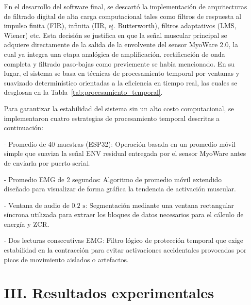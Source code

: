 \documentclass[conference]{IEEEtran}
\begin{document}
En el desarrollo del software final, se descart\'o la implementaci\'on de arquitecturas de filtrado digital de alta carga computacional tales como filtros de respuesta al impulso finita (FIR), infinita (IIR, ej. Butterworth), filtros adaptativos (LMS, Wiener) etc. Esta decisi\'on se justifica en que la se\~nal muscular principal se adquiere directamente de la salida de la envolvente del sensor MyoWare 2.0, la cual ya integra una etapa anal\'ogica de amplificaci\'on, rectificaci\'on de onda completa y filtrado paso-bajas como previemente se habia mencionado. En su lugar, el sistema se basa en t\'ecnicas de procesamiento temporal por ventanas y suavizado determin\'istico orientadas a la eficiencia en tiempo real, las cuales se desglosan en la Tabla~\ref{tab:procesamiento_temporal}.\cite{b5}

Para garantizar la estabilidad del sistema sin un alto costo computacional, se implementaron cuatro estrategias de procesamiento temporal descritas a continuaci\'on:

\begin{description}
    \item{- Promedio de 40 muestras (ESP32):} Operaci\'on basada en un promedio m\'ovil simple que suaviza la se\~nal ENV residual entregada por el sensor MyoWare antes de enviarla por puerto serial.
    \item{- Promedio EMG de 2 segundos:} Algoritmo de promedio m\'ovil extendido dise\~nado para visualizar de forma gr\'afica la tendencia de activaci\'on muscular.
    \item{- Ventana de audio de $0.2\text{ s}$:} Segmentaci\'on mediante una ventana rectangular s\'incrona utilizada para extraer los bloques de datos necesarios para el c\'alculo de energ\'ia y ZCR.
    \item{- Dos lecturas consecutivas EMG:} Filtro l\'ogico de protecci\'on temporal que exige estabilidad en la contracci\'on para evitar activaciones accidentales provocadas por picos de movimiento aislados o artefactos.
\end{description}

\section{III. Resultados experimentales}
\end{document}
